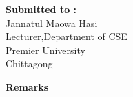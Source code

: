 \documentclass{scrreprt}
\begin{document}
\begin{titlepage}
\begin{minipage}[t]{0.5\textwidth}
        \textbf{Submitted to :}
        \\Jannatul Maowa Hasi
        \\Lecturer,Department of CSE
        \\ Premier University
        \\ Chittagong
    \end{minipage}%
    \begin{minipage}[t]{0.6\textwidth}
        \raggedleft
        \textbf{Remarks}\\
        \vspace{0.5cm} %
    \end{minipage}

    \date{\today}
    \vfill
\end{titlepage}
\newpage



\tableofcontents
\begin{center}   
\end{center}
\end{document}
